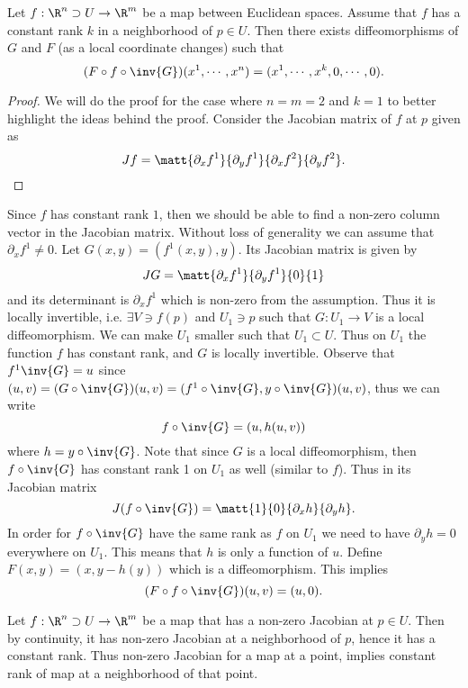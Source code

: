 \begin{theorem}
	Let $ f: \R^n \supset U \to \R^m $ be a map between Euclidean spaces. Assume that $ f $ has a constant rank $ k $ in a neighborhood of $ p \in U $. Then there exists diffeomorphisms of $ G $ and $ F $ (as a local coordinate changes) such that 
	\[ (F\circ f \circ\inv{G})(x^1,\cdots,x^n) = (x^1,\cdots,x^k,0,\cdots,0).  \]
\end{theorem}
\begin{proof}
	We will do the proof for the case where $ n = m = 2 $ and $ k = 1 $ to better highlight the ideas behind the proof. Consider the Jacobian matrix of $ f $ at $ p $ given as
	\[ Jf = \matt{\partial_x f^1}{\partial_y f^1}{\partial_x f^2}{\partial_y f^2}. \]
\end{proof}
Since $ f $ has constant rank $ 1 $, then we should be able to find a non-zero column vector in the Jacobian matrix. Without loss of generality we can assume that $ \partial_x f^1 \neq 0$. Let $ G(x,y) = (f^1(x,y),y) $. Its Jacobian matrix is given by
\[ JG = \matt{\partial_x f^1}{\partial_y f^1}{0}{1} \]
and its determinant is $ \partial_x f^1 $ which is non-zero from the assumption. Thus it is locally invertible, i.e. $ \exists V \ni f(p) $ and $ U_1 \ni p $ such that $ G: U_1\to V $ is a local diffeomorphism. We can make $ U_1 $ smaller such that $ U_1\subset U $. Thus on $ U_1 $ the function $ f $ has constant rank, and $ G $ is locally invertible. Observe that $ f^1 \inv{G} = u $ since
$ (u,v) = (G\circ \inv{G})(u,v) = (f^1\circ \inv{G}, y\circ\inv{G})(u,v) $, 
thus we can write
\[ f\circ \inv{G} = (u, h(u,v)) \]
where $ h = y \circ\inv{G} $. Note that since $ G $ is a local diffeomorphism, then $ f\circ\inv{G} $ has constant rank 1 on $ U_1 $ as well (similar to $ f $). Thus in its Jacobian matrix
\[ J (f\circ\inv{G}) = \matt{1}{0}{\partial_x h}{\partial_y h}. \]
In order for $ f\circ\inv{G} $ have the same rank as $ f $ on $ U_1 $ we need to have $ \partial_y h = 0$ everywhere on $ U_1 $. This means that $ h $ is only a function of $ u $. Define $ F(x,y) = (x,y-h(y)) $ which is a diffeomorphism. This implies 
\[ (F\circ f\circ\inv{G})(u,v) = (u,0). \]

\begin{example}
	Let $ f: \R^n \supset U \to \R^m $ be a map that has a non-zero Jacobian at $ p \in U $. Then by continuity, it has non-zero Jacobian at a neighborhood of $ p $, hence it has a constant rank. Thus non-zero Jacobian for a map at a point, implies constant rank of map at a neighborhood of that point. 
\end{example}


